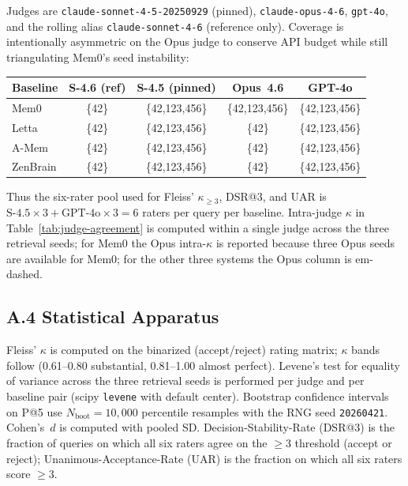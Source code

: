 \documentclass{article}
\begin{document}
Judges are \texttt{claude-sonnet-4-5-20250929} (pinned),
\texttt{claude-opus-4-6}, \texttt{gpt-4o}, and the rolling alias
\texttt{claude-sonnet-4-6} (reference only).
Coverage is intentionally asymmetric on the Opus judge to conserve
API budget while still triangulating Mem0's seed
instability:

\begin{center}
\small
\begin{tabular}{lcccc}
\toprule
Baseline & S-4.6 (ref) & S-4.5 (pinned) & Opus~4.6 & GPT-4o \\
\midrule
Mem0     & \{42\}            & \{42,123,456\} & \{42,123,456\} & \{42,123,456\} \\
Letta    & \{42\}            & \{42,123,456\} & \{42\}         & \{42,123,456\} \\
A-Mem    & \{42\}            & \{42,123,456\} & \{42\}         & \{42,123,456\} \\
ZenBrain & \{42\}            & \{42,123,456\} & \{42\}         & \{42,123,456\} \\
\bottomrule
\end{tabular}
\end{center}

Thus the six-rater pool used for Fleiss' $\kappa_{\geq 3}$,
DSR@3, and UAR is $\text{S-4.5}\times 3 + \text{GPT-4o}\times 3 = 6$
raters per query per baseline.
Intra-judge $\kappa$ in Table~\ref{tab:judge-agreement} is computed
within a single judge across the three retrieval seeds;
for Mem0 the Opus intra-$\kappa$ is reported because
three Opus seeds are available for Mem0; for the other
three systems the Opus column is em-dashed.

\subsection*{A.4 Statistical Apparatus}

Fleiss' $\kappa$ is computed on the binarized (accept/reject)
rating matrix; $\kappa$ bands follow \citet{landis1977}
(0.61--0.80 substantial, 0.81--1.00 almost perfect).
Levene's test for equality of variance across the three retrieval
seeds is performed per judge and per baseline pair
(scipy \texttt{levene} with default center).
Bootstrap confidence intervals on P@5 use $N_{\text{boot}} = 10{,}000$
percentile resamples with the RNG seed \texttt{20260421}.
Cohen's~$d$ is computed with pooled SD.
Decision-Stability-Rate (DSR@3) is the fraction of queries on which
all six raters agree on the $\geq 3$ threshold (accept or reject);
Unanimous-Acceptance-Rate (UAR) is the fraction on which all six
raters score $\geq 3$.
\end{document}
